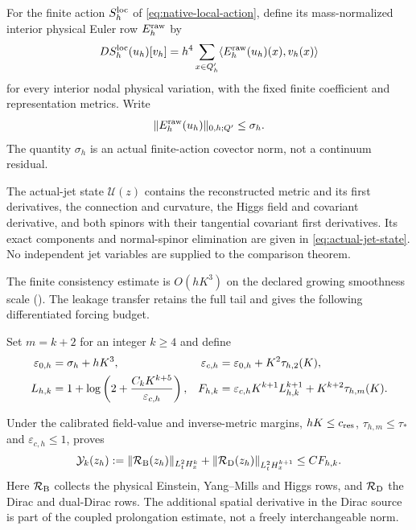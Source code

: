 \documentclass[11pt]{article}
\numberwithin{equation}{section}
\theoremstyle{definition}
\theoremstyle{remark}
\newcommand{\norm}[1]{\lVert#1\rVert}
\newcommand{\ip}[2]{\langle#1,#2\rangle}
\begin{document}
For the finite action $S_h^{\rm loc}$ of \eqref{eq:native-local-action}, define its mass-normalized interior physical Euler row $E_h^{\rm raw}$ by
\begin{equation}
 D S_h^{\rm loc}(u_h)[v_h]
 =h^4\sum_{x\in Q'_h}\ip{E_h^{\rm raw}(u_h)(x)}{v_h(x)}
 \label{eq:raw-euler-row}
\end{equation}
for every interior nodal physical variation, with the fixed finite coefficient and representation metrics.  Write
\begin{equation}
 \norm{E_h^{\rm raw}(u_h)}_{0,h;Q'}\le \sigma_h.
 \label{eq:native-sigma}
\end{equation}
The quantity $\sigma_h$ is an actual finite-action covector norm, not a continuum residual.

The actual-jet state $\mathcal U(z)$ contains the reconstructed metric
and its first derivatives, the connection and curvature, the Higgs field
and covariant derivative, and both spinors with their tangential covariant
first derivatives. Its exact components and normal-spinor elimination
are given in \eqref{eq:actual-jet-state}. No independent jet variables
are supplied to the comparison theorem.

The finite consistency estimate is $O(hK^3)$ on the declared growing
smoothness scale (). The leakage transfer
retains the full tail and gives the following differentiated forcing budget.

Set $m=k+2$ for an integer $k\ge4$ and define
\begin{align}
 \varepsilon_{0,h}&=\sigma_h+hK^3,
 &\varepsilon_{c,h}&=\varepsilon_{0,h}+K^2\tau_{h,2}(K),\notag\\
 L_{h,k}&=1+\log\left(2+\frac{C_kK^{k+5}}{\varepsilon_{c,h}}\right),
 &F_{h,k}&=\varepsilon_{c,h}K^{k+1}L_{h,k}^{k+1}
             +K^{k+2}\tau_{h,m}(K).
 \label{eq:native-forcing-budget}
\end{align}

Under the calibrated field-value and inverse-metric margins,
$hK\le c_{\rm res}$, $\tau_{h,m}\le\tau_*$ and
$\varepsilon_{c,h}\le1$,  proves
\[
 \mathcal Y_k(z_h):=
 \|\mathcal R_{\rm B}(z_h)\|_{L_t^2H_x^k}
 +\|\mathcal R_{\rm D}(z_h)\|_{L_t^2H_x^{k+1}}
 \le C F_{h,k}.
\]
Here $\mathcal R_{\rm B}$ collects the physical Einstein, Yang--Mills and
Higgs rows, and $\mathcal R_{\rm D}$ the Dirac and dual-Dirac rows.
The additional spatial derivative in the Dirac source is part of the
coupled prolongation estimate, not a freely interchangeable norm.
\end{document}
